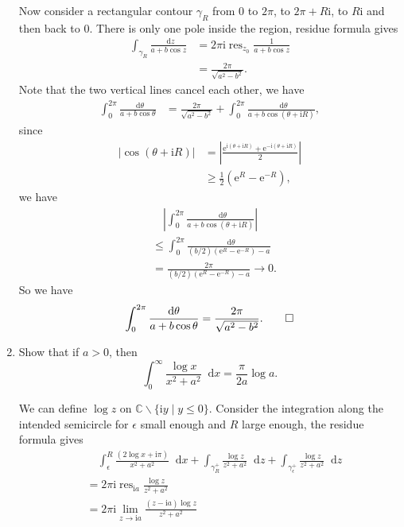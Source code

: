 \documentclass[11pt]{report}
\theoremstyle{mythm}
\let\oldendproof\endproof
\renewenvironment{proof}[1][\proofname]{%
  \oldproof[\normalfont \bfseries #1]%
}{\oldendproof}
\renewcommand*{\proofname}{Proof}
\theoremstyle{myans}
\newcommand{\mi}{\mathrm{i}}
\newcommand{\me}{\mathrm{e}}
\newcommand{\dd}{\mathop{}\!\mathrm{d}}
\newcommand{\bbC}{\mathbb{C}}
\DeclareMathOperator{\res}{res}
\begin{document}
\begin{enumerate}
\begin{proof}
    Now consider a rectangular contour $\gamma_R$ from $0$ to $2\pi$, to $2\pi+R\mi$, to $R\mi$ and then back to $0$.
    There is only one pole inside the region, residue formula gives
    \begin{align*}
      \int_{\gamma_R} \frac{\dd z}{a + b\cos z} & = 2\pi \mi \res_{z_0} \frac 1{a + b\cos z}\\
      &= \frac{2\pi}{\sqrt{a^2-b^2}}.
    \end{align*}
    Note that the two vertical lines cancel each other, we have
    \begin{align*}
      \int_0^{2\pi} \frac{\dd \theta}{a + b\cos \theta} &= \frac{2\pi}{\sqrt{a^2-b^2}}
      + \int_0^{2\pi} \frac{\dd \theta}{a + b \cos(\theta + \mi R)},
    \end{align*}
    since
    \begin{align*}
      \left|\cos (\theta + \mi R)\right| &= \left| \frac{\me^{\mi(\theta + \mi R)}+\me^{-\mi(\theta + \mi R)}}{2} \right|\\
      &\geq \frac 12 (\me^{R} - \me^{-R}),
    \end{align*}
    we have
    \begin{align*}
      &\quad \left|\int_0^{2\pi} \frac{\dd \theta}{a + b \cos(\theta + \mi R)}\right|\\
      &\leq \int_0^{2\pi} \frac{\dd \theta}{(b/2)(\me^{R}-\me^{-R}) - a}\\
      &= \frac{2\pi}{(b/2)(\me^{R}-\me^{-R}) - a} \to 0.
    \end{align*}
    So we have
    \[ \int_0^{2\pi} \frac{\dd \theta}{a + b\cos \theta} = \frac{2\pi}{\sqrt{a^2-b^2}}. \qedhere \]
  \end{proof}
  \setcounter{enumi}{9}
  \item Show that if $a > 0$, then
  \[ \int_0^\infty \frac{\log x}{x^2+a^2}\dd x = \frac{\pi}{2a}\log a. \]
  \begin{proof}
    We can define $\log z$ on $\bbC \smallsetminus \{ \mi y \mid y \leq 0 \}$.
    Consider the integration along the intended semicircle for $\epsilon$ small enough
    and $R$ large enough, the residue formula gives
    \begin{align*}
      &\quad \int_\epsilon^R \frac{(2\log x + \mi \pi)}{x^2+a^2} \dd x
      + \int_{\gamma_R^+} \frac{\log z}{z^2+a^2}\dd z
      + \int_{\gamma_\epsilon^+} \frac{\log z}{z^2+a^2}\dd z\\
      &= 2\pi \mi \res_{\mi a} \frac{\log z}{z^2+a^2}\\
      &= 2\pi \mi \lim_{z\to \mi a} \frac{(z-\mi a)\log z}{z^2+a^2}\\

\end{align*}
\end{proof}
\end{enumerate}
\end{document}
